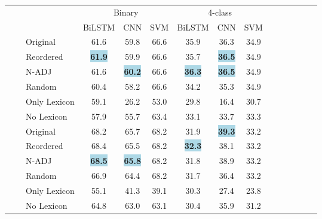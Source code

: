 \documentclass[11pt,a4paper]{article}
\newcommand{\rt}[1]{\rotatebox{90}{#1}}
\begin{document}
\begin{table*}[]
\newcommand{\sep}{\cmidrule(r){4-6}\cmidrule(r){7-9}}
\newcommand{\sepp}{\cmidrule(r){4-4}\cmidrule(r){5-5}\cmidrule(r){6-6}\cmidrule(r){7-7}\cmidrule(r){8-8}\cmidrule(r){9-9}}


\newcommand{\bestproj}[1]{{\setlength{\fboxsep}{0pt}\colorbox{lightblue}{\textbf{#1}}}}
\newcommand{\bestmono}[1]{{\setlength{\fboxsep}{0pt}\colorbox{lightgreen}{\textbf{#1}}}}
\newcommand{\bestmt}[1]{{\setlength{\fboxsep}{0pt}\colorbox{pink}{\textbf{#1}}}}

\setlength\tabcolsep{10pt}
\renewcommand*{\arraystretch}{0.8}
\centering\small
\begin{tabular}{lllcccccccccccc}
\toprule
&& & \multicolumn{3}{c}{Binary} & \multicolumn{3}{c}{4-class} \\
\sep
\multirow{14}{*}{\rt{Bilingual Word Embeddings}} 
	& \multirow{6}{*}{\rt{EN-ES}}
	    && BiLSTM & CNN & SVM & BiLSTM & CNN & SVM \\
	    \cmidrule(r){4-4}\cmidrule(r){5-5}\cmidrule(r){6-6}\cmidrule(r){7-7}\cmidrule(r){8-8}\cmidrule(r){9-9}
		&& Original 	 & 61.6 & 59.8 & 66.6 & 35.9 & 36.3 & 34.9 \\ 
		&& Reordered  & \bestproj{61.9} & 59.9 & 66.6 & 35.7 & \bestproj{36.5} & 34.9 \\ 
		&& N-ADJ  & 61.6 & \bestproj{60.2} & 66.6 & \bestproj{36.3} & \bestproj{36.5} & 34.9 \\ 
		&& Random  & 60.4 & 58.2 & 66.6 & 34.2 & 35.3 & 34.9 \\ 
		&& Only Lexicon  & 59.1 & 26.2 & 53.0 & 29.8 & 16.4 & 30.7 \\ 
		&& No Lexicon  & 57.9 & 55.7 & 63.4 & 33.1 & 33.7 & 33.3 \\ 
	\sepp
	& \multirow{6}{*}{\rt{EN-CA}}
  		& Original & 68.2 & 65.7 & 68.2 & 31.9 & \bestproj{39.3} & 33.2 \\ 
		&& Reordered  & 68.4 & 65.5 & 68.2 & \bestproj{32.3} & 38.1 & 33.2 \\ 
		&& N-ADJ &  \bestproj{68.5} & \bestproj{65.8} & 68.2 & 31.8 & 38.9 & 33.2 \\ 
		&& Random & 66.9 & 64.4 & 68.2 & 31.7 & 36.4 & 33.2 \\ 
		&& Only Lexicon  & 55.1 & 41.3 & 39.1 & 30.3 & 27.4 & 23.8 \\ 
		&& No Lexicon & 64.8 & 63.0 & 63.1 & 30.4 & 35.9 & 31.2 \\ 



\end{tabular}
\end{table*}
\end{document}
